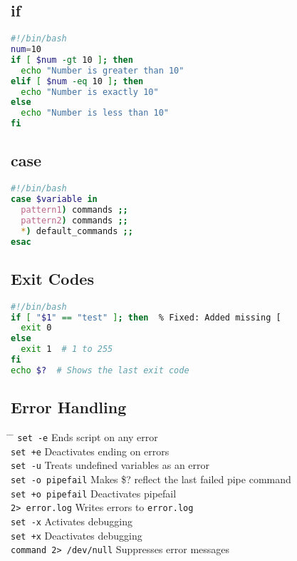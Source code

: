 \documentclass[a4paper,10pt]{article}
\begin{document}
\subsection{if}
\begin{lstlisting}[language=bash]
#!/bin/bash
num=10
if [ $num -gt 10 ]; then
  echo "Number is greater than 10"
elif [ $num -eq 10 ]; then
  echo "Number is exactly 10"
else
  echo "Number is less than 10"
fi
\end{lstlisting}

\subsection{case}
\begin{lstlisting}[language=bash]
#!/bin/bash
case $variable in
  pattern1) commands ;; 
  pattern2) commands ;; 
  *) default_commands ;;
esac
\end{lstlisting}

\subsection{Exit Codes}
\begin{lstlisting}[language=bash]
#!/bin/bash
if [ "$1" == "test" ]; then  % Fixed: Added missing [
  exit 0 
else 
  exit 1  # 1 to 255
fi
echo $?  # Shows the last exit code
\end{lstlisting}

\subsection{Error Handling}
\begin{tabbing}
	\= \hspace{30mm} \= \hspace{50mm} \kill
	\> \verb|set -e| \> Ends script on any error \\
	\> \verb|set +e| \> Deactivates ending on errors \\
	\> \verb|set -u| \> Treats undefined variables as an error \\
	\> \verb|set -o pipefail| \> Makes \$? reflect the last failed pipe command \\
	\> \verb|set +o pipefail| \> Deactivates pipefail \\
	\> \verb|2> error.log| \> Writes errors to \verb|error.log| \\
	\> \verb|set -x| \> Activates debugging \\
	\> \verb|set +x| \> Deactivates debugging \\
	\> \verb|command 2> /dev/null| \> Suppresses error messages \\
\end{tabbing}
\end{document}
